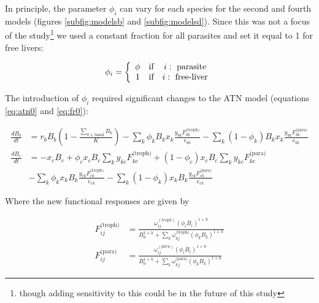 \documentclass[11pt]{amsart}
\begin{document}
In principle, the parameter $\phi_i$ can vary for each species for the second and fourth models (figures \ref{subfig:modelsb} and \ref{subfig:modelsd}).  Since this was not a focus of the study\footnote{though adding sensitivity to this could be in the future of this study} we used a constant fraction for all parasites and set it equal to 1 for free livers:

\begin{equation}
\phi_i = 
\left\{
\begin{array}{c c c}
\phi & \text{if} & i:\text{ parasite}\\
1 & \text{if} & i:\text{ free-liver}\\
\end{array}\right.\label{eq:phi}
\end{equation}

The introduction of $\phi_i$ required significant changes to the ATN model (equations \eqref{eq:atn0} and \eqref{eq:fr0}):


\begin{subequations}\label{eq:atn1}
\begin{align}
\frac{dB_{b}}{dt} &= r_bB_b\left(1-\frac{\sum_{k\in\text{basal}}B_k}{K}\right) - \sum_k\phi_kB_kx_k\frac{y_{bk}F_{bk}^\text{(troph)}}{e_{bk}} - \sum_k(1-\phi_k)B_kx_k\frac{y_{bk}F^\text{(para)}_{bk}}{e_{bk}}\label{subeq:basal1} \\ 
\frac{dB_{c}}{dt} &= -x_cB_c + \phi_cx_cB_c\sum_ky_{kc}F^\text{(troph)}_{kc} + (1-\phi_c)x_cB_c\sum_ky_{kc}F^\text{(para)}_{kc} \label{subeq:con1}\\ 
& - \sum_k \phi_kx_kB_k\frac{y_{ck}F^\text{(troph)}_{ck}}{e_{ck}} - \sum_k (1-\phi_k)x_kB_k\frac{y_{ck}F^\text{(para)}_{ck}}{e_{ck}}\nonumber
\end{align}
\end{subequations}

Where the new functional responses are given by 

\begin{subequations}\label{eq:fr1}
\begin{align}F_{ij}^\text{(troph)} &= \frac{\omega_{ij}^{(troph)}(\phi_iB_i)^{1+h}}{B_0^{1+h} + \sum_k\omega^\text{(troph)}_{kj}(\phi_kB_k)^{1+h}} \label{subeq:fr1troph}\\
F_{ij}^\text{(para)} &= \frac{\omega_{ij}^{(para)}(\phi_iB_i)^{1+h}}{B_0^{1+h} + \sum_k\omega^\text{(para)}_{kj}(\phi_kB_k)^{1+h}} \label{subeq:fr1para}
\end{align}
\end{subequations}
\end{document}
